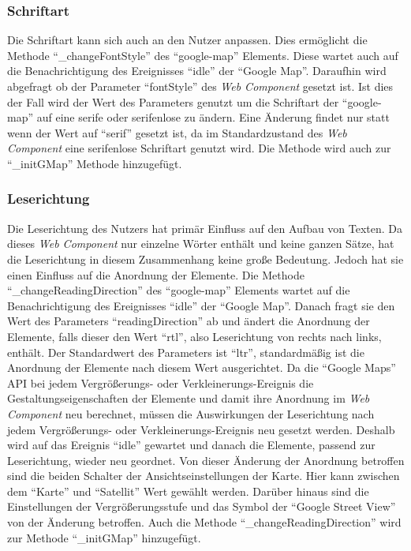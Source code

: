 \documentclass[12pt, paper=a4, bibtotoc, toc=listof, headsepline=true, numbers=endperiod]{scrreprt}
\begin{document}
	\subsubsection{Schriftart}
	Die Schriftart kann sich auch an den Nutzer anpassen. Dies ermöglicht die Methode \enquote{\_changeFontStyle} des \enquote{google-map} Elements. Diese wartet auch auf die Benachrichtigung des Ereignisses \enquote{idle} der \enquote{Google Map}. Daraufhin wird abgefragt ob der Parameter \enquote{fontStyle} des \emph{Web Component} gesetzt ist. Ist dies der Fall wird der Wert des Parameters genutzt um die Schriftart der \enquote{google-map} auf eine serife oder serifenlose zu ändern. Eine Änderung findet nur statt wenn der Wert auf \enquote{serif} gesetzt ist, da im Standardzustand des \emph{Web Component} eine serifenlose Schriftart genutzt wird. Die Methode wird auch zur \enquote{\_initGMap} Methode hinzugefügt.
	\subsubsection{Leserichtung}
	Die Leserichtung des Nutzers hat primär Einfluss auf den Aufbau von Texten. Da dieses \emph{Web Component} nur einzelne Wörter enthält und keine ganzen Sätze, hat die Leserichtung in diesem Zusammenhang keine große Bedeutung. Jedoch hat sie einen Einfluss auf die Anordnung der Elemente. Die Methode \enquote{\_changeReadingDirection} des \enquote{google-map} Elements wartet auf die Benachrichtigung des Ereignisses \enquote{idle} der \enquote{Google Map}. Danach fragt sie den Wert des Parameters \enquote{readingDirection} ab und ändert die Anordnung der Elemente, falls dieser den Wert \enquote{rtl}, also Leserichtung von rechts nach links, enthält. Der Standardwert des Parameters ist \enquote{ltr}, standardmäßig ist die Anordnung der Elemente nach diesem Wert ausgerichtet. Da die \enquote{Google Maps} \ac{API} bei jedem Vergrößerungs- oder Verkleinerungs-Ereignis die Gestaltungseigenschaften der Elemente und damit ihre Anordnung im \emph{Web Component} neu berechnet, müssen die Auswirkungen der Leserichtung nach jedem Vergrößerungs- oder Verkleinerungs-Ereignis neu gesetzt werden. Deshalb wird auf das Ereignis \enquote{idle} gewartet und danach die Elemente, passend zur Leserichtung, wieder neu geordnet. Von dieser Änderung der Anordnung betroffen sind die beiden Schalter der Ansichtseinstellungen der Karte. Hier kann zwischen dem \enquote{Karte} und \enquote{Satellit} Wert gewählt werden. Darüber hinaus sind die Einstellungen der Vergrößerungsstufe und das Symbol der \enquote{Google Street View} von der Änderung betroffen. Auch die Methode \enquote{\_changeReadingDirection} wird zur Methode \enquote{\_initGMap} hinzugefügt.
\end{document}
